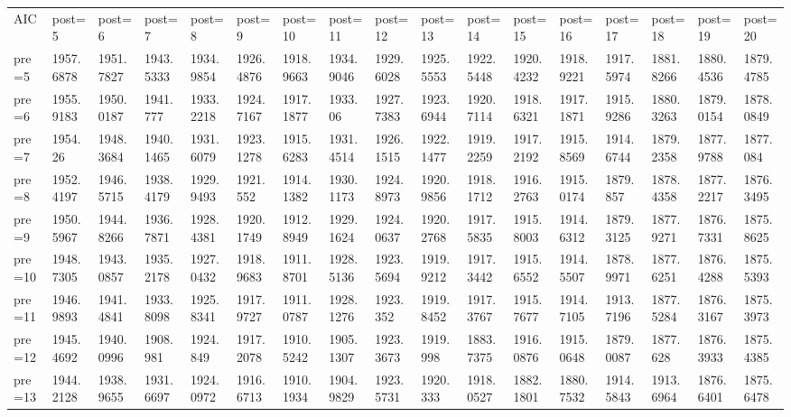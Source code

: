 \documentclass[11pt]{article}
\begin{document}
    \begin{tabular}{lllllllllllllllll}
	 AIC         & post=5      & post=6      & post=7      & post=8      & post=9      & post=10     & post=11     & post=12     & post=13     & post=14     & post=15     & post=16     & post=17     & post=18     & post=19     & post=20    \\
	 pre=5       & 1957.6878   & 1951.7827   & 1943.5333   & 1934.9854   & 1926.4876   & 1918.9663   & 1934.9046   & 1929.6028   & 1925.5553   & 1922.5448   & 1920.4232   & 1918.9221   & 1917.5974   & 1881.8266   & 1880.4536   & 1879.4785  \\
	 pre=6       & 1955.9183   & 1950.0187   & 1941.777    & 1933.2218   & 1924.7167   & 1917.1877   & 1933.06     & 1927.7383   & 1923.6944   & 1920.7114   & 1918.6321   & 1917.1871   & 1915.9286   & 1880.3263   & 1879.0154   & 1878.0849  \\
	 pre=7       & 1954.26     & 1948.3684   & 1940.1465   & 1931.6079   & 1923.1278   & 1915.6283   & 1931.4514   & 1926.1515   & 1922.1477   & 1919.2259   & 1917.2192   & 1915.8569   & 1914.6744   & 1879.2358   & 1877.9788   & 1877.084   \\
	 pre=8       & 1952.4197   & 1946.5715   & 1938.4179   & 1929.9493   & 1921.552    & 1914.1382   & 1930.1173   & 1924.8973   & 1920.9856   & 1918.1712   & 1916.2763   & 1915.0174   & 1879.857    & 1878.4358   & 1877.2217   & 1876.3495  \\
	 pre=9       & 1950.5967   & 1944.8266   & 1936.7871   & 1928.4381   & 1920.1749   & 1912.8949   & 1929.1624   & 1924.0637   & 1920.2768   & 1917.5835   & 1915.8003   & 1914.6312   & 1879.3125   & 1877.9271   & 1876.7331   & 1875.8625  \\
	 pre=10      & 1948.7305   & 1943.0857   & 1935.2178   & 1927.0432   & 1918.9683   & 1911.8701   & 1928.5136   & 1923.5694   & 1919.9212   & 1917.3442   & 1915.6552   & 1914.5507   & 1878.9971   & 1877.6251   & 1876.4288   & 1875.5393  \\
	 pre=11      & 1946.9893   & 1941.4841   & 1933.8098   & 1925.8341   & 1917.9727   & 1911.0787   & 1928.1276   & 1923.352    & 1919.8452   & 1917.3767   & 1915.7677   & 1914.7105   & 1913.7196   & 1877.5284   & 1876.3167   & 1875.3973  \\
	 pre=12      & 1945.4692   & 1940.0996   & 1908.981    & 1924.849    & 1917.2078   & 1910.5242   & 1905.1307   & 1923.3673   & 1919.998    & 1883.7375   & 1916.0876   & 1915.0648   & 1879.0087   & 1877.628    & 1876.3933   & 1875.4385  \\
	 pre=13      & 1944.2128   & 1938.9655   & 1931.6697   & 1924.0972   & 1916.6713   & 1910.1934   & 1904.9829   & 1923.5731   & 1920.333    & 1918.0527   & 1882.1801   & 1880.7532   & 1914.5843   & 1913.6964   & 1876.6401   & 1875.6478  \\

\end{tabular}
\end{document}
